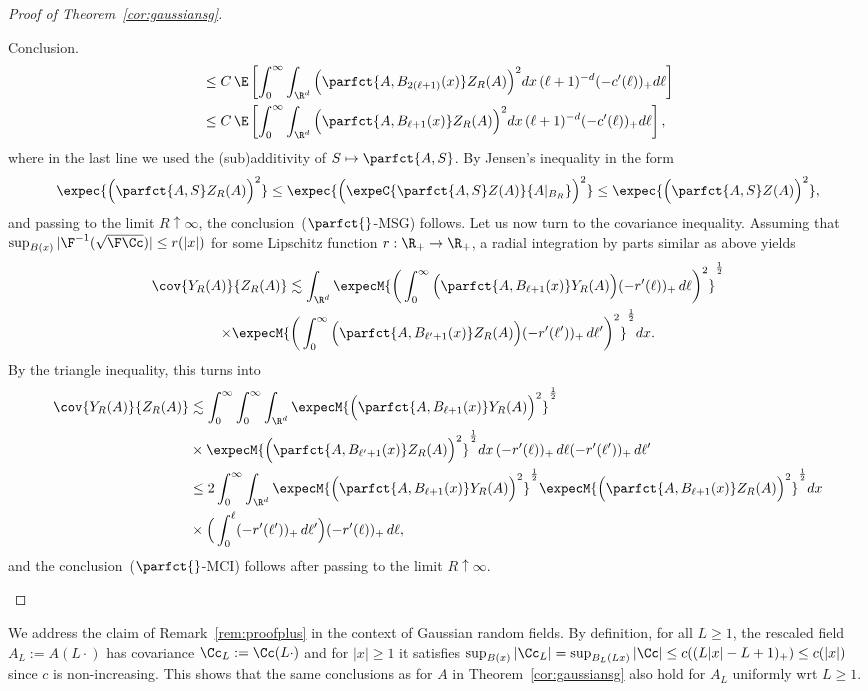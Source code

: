 \begin{proof}[Proof of Theorem~\ref{cor:gaussiansg}]
\begin{step}{Conclusion.}
\begin{align*}
&\le C\,\E\left[\int_0^\infty \int_{\R^d}\Big(\parfct{A,B_{2(\ell+1)}(x)}Z_R(A)\Big)^2dx\,(\ell+1)^{-d}(-c'(\ell))_+d\ell\right]\\
&\le C\, \E\left[\int_0^\infty \int_{\R^d}\Big(\parfct{A,B_{\ell+1}(x)}Z_R(A)\Big)^2dx\,(\ell+1)^{-d}(-c'(\ell))_+d\ell\right],
\end{align*}
where in the last line we used the (sub)additivity of $S\mapsto\parfct{A,S}$. By Jensen's inequality in the form
\[
\expec{\Big(\parfct{A,S}Z_R(A)\Big)^2}\le\expec{\Big(\expeC{\parfct{A,S}Z(A)}{A|_{B_R}}\Big)^2}\le\expec{\Big(\parfct{A,S}Z(A)\Big)^2},
\]
and passing to the limit $R\uparrow\infty$, the conclusion~($\parfct{}$-MSG) follows. Let us now turn to the covariance inequality. Assuming that $\sup_{B(x)}|\F^{-1}(\sqrt{\F\Cc})|\le r(|x|)$ for some Lipschitz function $r:\R_+\to\R_+$, a radial integration by parts similar as above yields
\begin{multline*}
\cov {Y_R(A)}{Z_R(A)}\lesssim \int_{\R^d}\expecM{\bigg(\int_0^\infty \Big(\parfct{A,B_{\ell+1}(x)}Y_R(A)\Big)(-r'(\ell))_+\,d\ell\bigg)^2}^\frac12\\
\times\expecM{\bigg(\int_0^\infty \Big(\parfct{A,B_{\ell'+1}(x)}Z_R(A)\Big)(-r'(\ell'))_+\,d\ell'\bigg)^2}^\frac12 dx.
\end{multline*}
By the triangle inequality, this turns into
\begin{align*}
\cov {Y_R(A)}{Z_R(A)}&\lesssim \int_0^\infty\int_0^\infty\int_{\R^d}\expecM{\Big(\parfct{A,B_{\ell+1}(x)}Y_R(A)\Big)^2}^\frac12\\
&\times\expecM{\Big(\parfct{A,B_{\ell'+1}(x)}Z_R(A)\Big)^2}^\frac12 dx\,(-r'(\ell))_+\,d\ell(-r'(\ell'))_+\,d\ell'\\
&\le2\int_0^\infty\int_{\R^d}\expecM{\Big(\parfct{A,B_{\ell+1}(x)}Y_R(A)\Big)^2}^\frac12\expecM{\Big(\parfct{A,B_{\ell+1}(x)}Z_R(A)\Big)^2}^\frac12dx\\
&\times \Big(\int_0^\ell(-r'(\ell'))_+\,d\ell'\Big)(-r'(\ell))_+\,d\ell,
\end{align*}
and the conclusion~($\parfct{}$-MCI) follows after passing to the limit $R\uparrow\infty$.
\end{step}
\end{proof}

\begin{rema}\label{rem:rescale-2}
We address the claim of Remark~\ref{rem:proofplus} in the context of Gaussian random fields. By definition, for all $L\ge1$, the rescaled field $A_L:=A(L\cdot)$ has covariance $\Cc_L:=\Cc(L\cdot)$ and for $|x|\ge1$ it satisfies $\sup_{B(x)}|\Cc_L|=\sup_{B_L(Lx)}|\Cc|\linebreak\le c((L|x|-L+1)_+)\le c(|x|)$ since $c$ is non-increasing. This shows that the same conclusions as for $A$ in Theorem~\ref{cor:gaussiansg} also hold for $A_L$ uniformly wrt $L\ge1$.
\end{rema}







